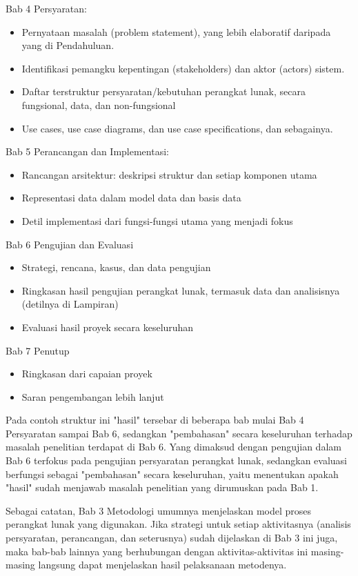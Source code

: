 \begin{displayquote}
  Bab 4 Persyaratan:
  \begin{itemize}
    \item Pernyataan masalah (problem statement), yang lebih elaboratif daripada yang di Pendahuluan.
    \item Identifikasi pemangku kepentingan (stakeholders) dan aktor (actors) sistem.
    \item Daftar terstruktur persyaratan/kebutuhan perangkat lunak, secara fungsional, data, dan non-fungsional
    \item Use cases, use case diagrams, dan use case specifications, dan sebagainya. 
  \end{itemize} 
  Bab 5 Perancangan dan Implementasi:
  \begin{itemize}
    \item Rancangan arsitektur: deskripsi struktur dan setiap komponen utama  
    \item Representasi data dalam model data dan basis data 
    \item Detil implementasi dari fungsi-fungsi utama yang menjadi fokus
  \end{itemize}
  Bab 6 Pengujian dan Evaluasi
  \begin{itemize}
    \item Strategi, rencana, kasus, dan data pengujian
    \item Ringkasan hasil pengujian perangkat lunak, termasuk data dan analisisnya (detilnya di Lampiran)
    \item Evaluasi hasil proyek secara keseluruhan
  \end{itemize}
  Bab 7 Penutup
  \begin{itemize}
    \item Ringkasan dari capaian proyek
    \item Saran pengembangan lebih lanjut
  \end{itemize}
\end{displayquote}

Pada contoh struktur ini "hasil" tersebar di beberapa bab mulai Bab 4 Persyaratan sampai Bab 6, sedangkan "pembahasan" secara keseluruhan terhadap masalah penelitian terdapat di Bab 6. Yang dimaksud dengan pengujian dalam Bab 6 terfokus pada pengujian persyaratan perangkat lunak, sedangkan evaluasi berfungsi sebagai "pembahasan" secara keseluruhan, yaitu menentukan apakah "hasil" sudah menjawab masalah penelitian yang dirumuskan pada Bab 1. 

Sebagai catatan, Bab 3 Metodologi umumnya menjelaskan model proses perangkat lunak yang digunakan. Jika strategi untuk setiap aktivitasnya (analisis persyaratan, perancangan, dan seterusnya) sudah dijelaskan di Bab 3 ini juga, maka bab-bab lainnya yang berhubungan dengan aktivitas-aktivitas ini masing-masing langsung dapat menjelaskan hasil pelaksanaan metodenya. 

